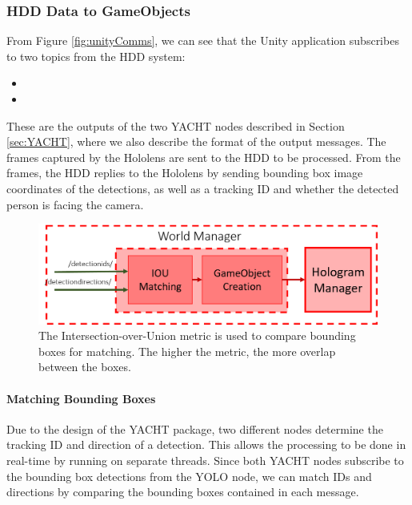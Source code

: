 \subsubsection{HDD Data to GameObjects} 
From Figure \ref{fig:unityComms}, we can see that the Unity application subscribes to two topics from the HDD system:

\begin{itemize}
    \item {}
    \item {}
\end{itemize}

These are the outputs of the two YACHT nodes described in Section \ref{sec:YACHT}, where we also describe the format of the output messages. The frames captured by the Hololens are sent to the HDD to be processed. From the frames, the HDD replies to the Hololens by sending bounding box image coordinates of the detections, as well as a tracking ID and whether the detected person is facing the camera.

\begin{figure}[ht]
    \centering
    \includegraphics[width=0.9\linewidth]{img/chapter5_implementation/holoworldbreakdown.png}
    \caption{The Intersection-over-Union metric is used to compare bounding boxes for matching. The higher the metric, the more overlap between the boxes.}
    \label{fig:ioumatching}
\end{figure}

\paragraph{Matching Bounding Boxes} Due to the design of the YACHT package, two different nodes determine the tracking ID and direction of a detection. This allows the processing to be done in real-time by running on separate threads. Since both YACHT nodes subscribe to the bounding box detections from the YOLO node, we can match IDs and directions by comparing the bounding boxes contained in each message. \\

